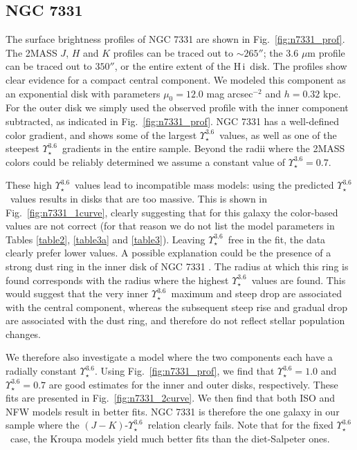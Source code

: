 \documentclass[usenatbib,usegraphicx,apjfonts,floatfix]{emulateapj}
\newcommand{\HI}{H\,{\sc i}}
\newcommand{\Ups}{\ensuremath{\Upsilon_{\star}^{3.6}}}
\begin{document}
\subsection{NGC 7331}

The surface brightness profiles of NGC 7331 are shown in
Fig.~\ref{fig:n7331_prof}. The 2MASS $J$, $H$ and $K$ profiles can be
traced out to $\sim 265''$; the 3.6 $\mu$m profile can be traced out
to $350''$, or the entire extent of the \HI\ disk.  The profiles show
clear evidence for a compact central component.  We modeled this
component as an exponential disk with parameters $\mu_0 = 12.0$ mag
arcsec$^{-2}$ and $h=0.32$ kpc.  For the outer disk we simply used the
observed profile with the inner component subtracted, as indicated in
Fig.~\ref{fig:n7331_prof}. NGC 7331 has a well-defined color gradient,
and shows some of the largest \Ups\ values, as well as one of the
steepest \Ups\ gradients in the entire sample. Beyond the radii where
the 2MASS colors could be reliably determined we assume a constant
value of $\Ups=0.7$.

These high \Ups\ values lead to incompatible mass models: using the
predicted \Ups\ values results in disks that are too massive.  This is
shown in Fig.~\ref{fig:n7331_1curve}, clearly suggesting that for this
galaxy the color-based values are not correct (for that reason we do
not list the model parameters in Tables \ref{table2}, \ref{table3a}
and \ref{table3}).  Leaving \Ups\ free in the fit, the data clearly
prefer lower values.  A possible explanation could be the presence of
a strong dust ring in the inner disk of NGC 7331
\citep{sings7331}. The radius at which this ring is found corresponds
with the radius where the highest \Ups\ values are found. This would
suggest that the very inner \Ups\ maximum and steep drop are
associated with the central component, whereas the subsequent steep
rise and gradual drop are associated with the dust ring, and therefore
do not reflect stellar population changes.

We therefore also investigate a model where the two components each
have a radially constant \Ups. Using Fig.~\ref{fig:n7331_prof}, we
find that $\Ups=1.0$ and $\Ups=0.7$ are good estimates for the inner
and outer disks, respectively. These fits are presented in
Fig.~\ref{fig:n7331_2curve}.  We then find that both ISO and NFW
models result in better fits.  NGC 7331 is therefore the one galaxy in
our sample where the $(J-K)$-\Ups\ relation clearly fails.  Note that
for the fixed \Ups\ case, the Kroupa models yield much better fits
than the diet-Salpeter ones.
\end{document}
